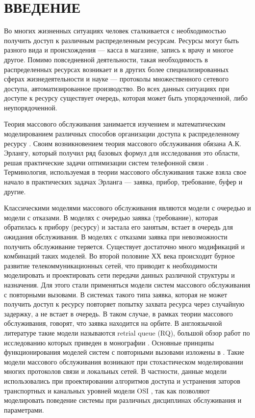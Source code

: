 \section*{\centering ВВЕДЕНИЕ}
Во многих жизненных ситуациях человек сталкивается с необходимостью получить доступ к различным распределенным ресурсам. Ресурсы могут быть разного вида и происхождения --- касса в магазине, запись к врачу и многое другое. Помимо повседневной деятельности, такая необходимость в распределенных ресурсах возникает и в других более специализированных сферах жизнедеятельности и науке --- протоколы множественного сетевого доступа, автоматизированное производство. Во всех данных ситуациях при доступе к ресурсу существует очередь, которая может быть упорядоченной, либо неупорядоченной.

Теория массового обслуживания занимается изучением и математическим моделированием различных способов организации доступа к распределенному ресурсу \cite{nazarov2010theory}. Своим возникновением теория массового обслуживания обязана А.К. Эрлангу, который получил ряд базовых формул для исследования это области, решая практические задачи оптимизации систем телефонной связи \cite{erlang1909theory}. Терминология, используемая в теории массового обслуживания также взяла свое начало в практических задачах Эрланга ---  заявка, прибор, требование, буфер и другие.

Классическими моделями массового обслуживания являются модели с очередью и модели с отказами. В моделях с очередью заявка (требование), которая обратилась к прибору (ресурсу) и застала его занятым, встает в очередь для ожидания обслуживания. В моделях с отказами заявка при невозможности получить обслуживание теряется. Существует достаточно много модификаций и комбинаций таких моделей. 
Во второй половине ХХ века происходит бурное развитие телекоммуникационных сетей, что приводит к необходимости моделировать и проектировать сети передачи данных различной структуры и назначения. Для этого стали применяться модели систем массового обслуживания с повторными вызовами. В системах такого типа заявка, которая не может получить доступ к ресурсу повторяет попытку захвата ресурса через случайную задержку, а не встает в очередь. В таком случае, в рамках теории массового обслуживания, говорят, что заявка находится на орбите. В англоязычной литературе такие модели называются retrial queue (RQ), большой обзор работ по исследованию которых приведен в монографии \cite{artalejo2010accessible}. Основные принципы функционирования моделей систем с повторными вызовами изложены в \cite{jesus2008retrial,falin1997retrial}. Такие модели массового обслуживания возникают при стохастическом моделировании многих протоколов связи и локальных сетей. В частности, данные модели использовались при проектировании алгоритмов доступа и устранения заторов транспортных и канальных уровней модели OSI \cite{bjornstad2006traffic,kritzinger1986performance,olypher2010computer}, так как позволяют моделировать поведение системы при различных дисциплинах обслуживания и параметрами.




